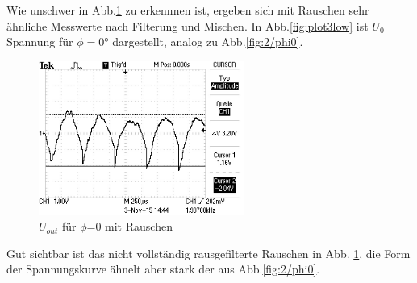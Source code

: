 Wie unschwer in Abb.\ref{fig:3/phi0} zu erkennnen ist, ergeben sich mit Rauschen
sehr ähnliche
Messwerte nach Filterung und Mischen. In Abb.\ref{fig:plot3low} ist $U_0$
Spannung für $\phi=0°$ dargestellt, analog zu Abb.\ref{fig:2/phi0}.

\begin{figure}[H]
  \centering
  \includegraphics[angle=90,width=0.6\textwidth, height=0.3\textwidth]{graphics/ALL0039/F0039TEK.jpg}
  \caption{$U_{out}$ für $\phi$=0 mit Rauschen}
  \label{fig:3/phi0}
\end{figure}

Gut sichtbar ist das nicht vollständig rausgefilterte Rauschen in Abb.
\ref{fig:3/phi0}, die Form der
Spannungskurve ähnelt aber stark der aus Abb.\ref{fig:2/phi0}.




